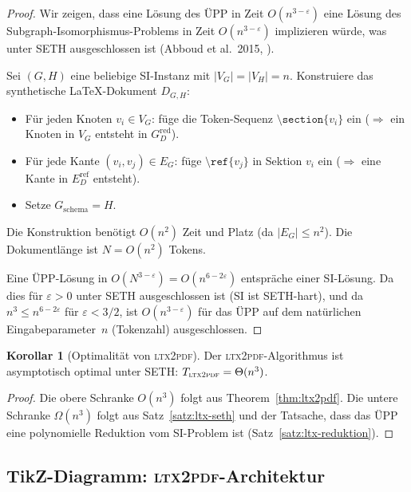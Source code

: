 ﻿\documentclass[a4paper,12pt]{article}
\theoremstyle{definition}
\newtheorem{korollar}{Korollar}
\begin{document}
\begin{proof}
	Wir zeigen, dass eine Lösung des ÜPP in Zeit $O(n^{3-\varepsilon})$
	eine Lösung des Subgraph-Isomorphismus-Problems in Zeit
	$O(n^{3-\varepsilon})$ implizieren würde, was unter SETH ausgeschlossen
	ist (Abboud et al.\ 2015, \cite{abboud2015}).
	
	Sei $(G, H)$ eine beliebige SI-Instanz mit $|V_G| = |V_H| = n$.
	Konstruiere das synthetische \LaTeX-Dokument $D_{G,H}$:
	\begin{itemize}
		\item Für jeden Knoten $v_i \in V_G$: füge die Token-Sequenz
		$\texttt{\textbackslash section\{$v_i$\}}$ ein
		($\Rightarrow$ ein Knoten in $V_G$ entsteht in $G_D^{\mathrm{red}}$).
		\item Für jede Kante $(v_i, v_j) \in E_G$: füge
		$\texttt{\textbackslash ref\{$v_j$\}}$ in Sektion $v_i$ ein
		($\Rightarrow$ eine Kante in $E_D^{\mathrm{ref}}$ entsteht).
		\item Setze $G_{\mathrm{schema}} = H$.
	\end{itemize}
	Die Konstruktion benötigt $O(n^2)$ Zeit und Platz (da $|E_G| \le n^2$).
	Die Dokumentlänge ist $N = O(n^2)$ Tokens.
	
	Eine ÜPP-Lösung in $O(N^{3-\varepsilon}) = O(n^{6-2\varepsilon})$
	entspräche einer SI-Lösung. Da dies für $\varepsilon > 0$ unter SETH
	ausgeschlossen ist (SI ist SETH-hart), und da $n^3 \le n^{6-2\varepsilon}$
	für $\varepsilon < 3/2$, ist $O(n^{3-\varepsilon})$ für das ÜPP auf
	dem natürlichen Eingabeparameter~$n$ (Tokenzahl) ausgeschlossen. 
\end{proof}

\begin{korollar}[Optimalität von \textsc{ltx2pdf}]
	\label{kor:ltx-optimal}
	Der \textsc{ltx2pdf}-Algorithmus ist asymptotisch optimal unter SETH:
	$T_{\textsc{ltx2pdf}} = \Theta(n^3)$.
\end{korollar}

\begin{proof}
	Die obere Schranke $O(n^3)$ folgt aus Theorem~\ref{thm:ltx2pdf}.
	Die untere Schranke $\Omega(n^3)$ folgt aus Satz~\ref{satz:ltx-seth}
	und der Tatsache, dass das ÜPP eine polynomielle Reduktion vom SI-Problem
	ist (Satz~\ref{satz:ltx-reduktion}). 
\end{proof}

\subsection{TikZ-Diagramm: \textsc{ltx2pdf}-Architektur}
\label{sec:ltx-diagramm}
\end{document}
